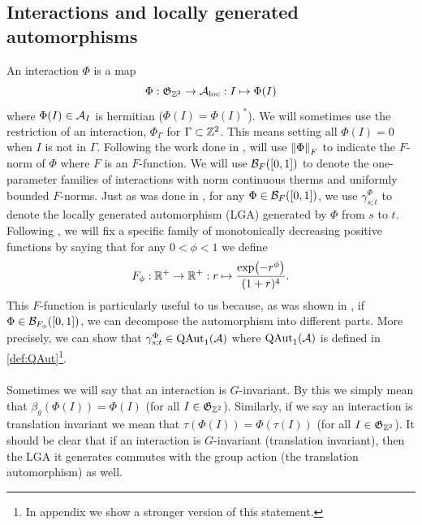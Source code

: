\documentclass[11pt,a4paper,twoside]{article}
\def\version{1}
\newcommand{\versionDifference}[2]{\ifthenelse{\version=0}{#1}{#2}}
\numberwithin{equation}{section}
\begin{document}
	\subsection{Interactions and locally generated automorphisms}\label{sec:Interactions}
	An interaction $\Phi$ is a map
	\begin{equation}
		\Phi: \mathfrak{G}_{\ZZ^2}\rightarrow \AA_{\text{loc}}: I \mapsto \Phi(I)
	\end{equation}
	where $\Phi(I)\in\AA_I$ is hermitian ($\Phi(I)=\Phi(I)^*$). We will sometimes use the restriction of an interaction, $\Phi_\Gamma$ for $\Gamma\subset\ZZ^2$. This means setting all $\Phi(I)=0$ when $I$ is not in $\Gamma$. Following the work done in \cite{doi:10.1063/1.5095769}, will use $\norm{\Phi}_F$ to indicate the $F$-norm of $\Phi$ where $F$ is an $F$-function. We will use $\BB_{F}([0,1])$ to denote the one-parameter families of interactions with norm continuous therms and uniformly bounded $F$-norms. Just as was done in \cite{doi:10.1063/1.5095769}, for any $\Phi\in \BB_{F}([0,1])$, we use $\gamma^{\Phi}_{s;t}$ to denote the locally generated automorphism (LGA) generated by $\Phi$ from $s$ to $t$. Following \cite{ogata2021h3gmathbb}, we will fix a specific family of monotonically decreasing positive functions by saying that for any $0<\phi<1$ we define
	\begin{equation}\label{eq:OurFFunction}
		F_\phi:\RR^+\rightarrow\RR^+:r\mapsto \frac{\exp(-r^\phi)}{(1+r)^4}.
	\end{equation}
	This $F$-function is particularly useful to us because, as was shown in \cite{ogata2021h3gmathbb}, if $\Phi\in\BB_{F_\phi}([0,1])$, we can decompose the automorphism into different parts. More precisely, we can show that $\gamma^{\Phi}_{s;t}\in\QAut{\AA}$ where $\QAut{\AA}$ is defined in \ref{def:QAut}\footnote{In appendix \versionDifference{\ref{sec:properties-of-locally-generated-automorphisms-1d}}{B of \cite{jappens2023spt}} we show a stronger version of this statement.}.
	\\\\
	Sometimes we will say that an interaction is $G$-invariant. By this we simply mean that $\beta_g(\Phi(I))=\Phi(I)$ (for all $I\in\mathfrak{G}_{\ZZ^2}$). Similarly, if we say an interaction is translation invariant we mean that $\tau(\Phi(I))=\Phi(\tau(I))$ (for all $I\in\mathfrak{G}_{\ZZ^2}$). It should be clear that if an interaction is $G$-invariant (translation invariant), then the LGA it generates commutes with the group action (the translation automorphism) as well.
\end{document}
